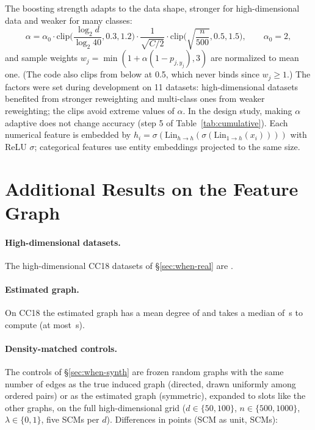 \documentclass[anon,12pt]{clear2027} %
\begin{document}
The boosting strength adapts to the data shape, stronger for high-dimensional data and weaker for many classes:
\[
\alpha=\alpha_0\cdot \mathrm{clip}\!\Big(\frac{\log_2 d}{\log_2 40},0.3,1.2\Big)\cdot \frac{1}{\sqrt{C/2}}\cdot \mathrm{clip}\!\Big(\sqrt{\frac{n}{500}},0.5,1.5\Big),\qquad \alpha_0=2,
\]
and sample weights $w_j=\min(1+\alpha(1-p_{j,y_j}),3)$ are normalized to mean one. (The code also clips from below at 0.5, which never binds since $w_j\ge1$.) The factors were set during development on 11 datasets: high-dimensional datasets benefited from stronger reweighting and multi-class ones from weaker reweighting; the clips avoid extreme values of $\alpha$. In the design study, making $\alpha$ adaptive does not change accuracy (step 5 of Table~\ref{tab:cumulative}). Each numerical feature is embedded by $h_i=\sigma(\mathrm{Lin}_{h\to h}(\sigma(\mathrm{Lin}_{1\to h}(x_i))))$ with ReLU $\sigma$; categorical features use entity embeddings \citep{guo2016entity} projected to the same size.

\section{Additional Results on the Feature Graph}
\label{app:when}

\paragraph{High-dimensional datasets.} The \RealNHigh{} high-dimensional CC18 datasets of \S\ref{sec:when-real} are \RealHighTasks{}.

\paragraph{Estimated graph.} On CC18 the estimated graph has a mean degree of \RealEstDegree{} and takes a median of \RealEstSecondsMedian{}\,s to compute (at most \RealEstSecondsMax{}\,s).

\paragraph{Density-matched controls.}
The controls of \S\ref{sec:when-synth} are frozen random graphs with the same number of edges as the true induced graph (directed, drawn uniformly among ordered pairs) or as the estimated graph (symmetric), expanded to slots like the other graphs, on the full high-dimensional grid ($d\in\{50,100\}$, $n\in\{500,1000\}$, $\lambda\in\{0,1\}$, five SCMs per $d$). Differences in points (SCM as unit, \SynCtrlN{} SCMs):
\end{document}
